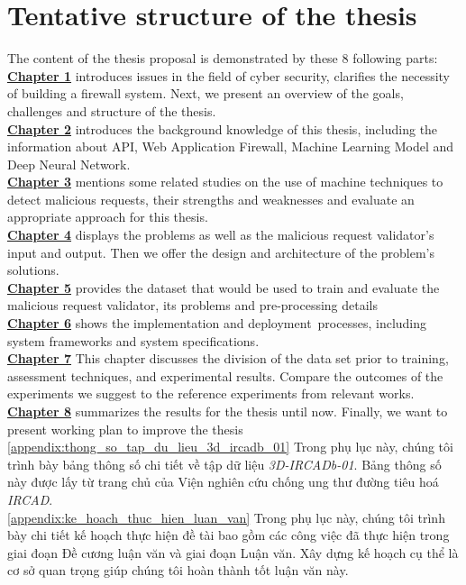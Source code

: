 \section{Tentative structure of the thesis}
\label{sec:structure}
	\newcommand\nextintro{\\[4mm]}
	The content of the thesis proposal is demonstrated by these 8 following parts: \nextintro
	\hyperref[chap:introduction]{\textbf{Chapter 1}} introduces issues in the field of cyber security, clarifies the necessity of building a firewall system. Next, we present an overview of the goals, challenges and structure of the thesis.\nextintro
	\hyperref[chap:backgrounds]{\textbf{Chapter 2}} introduces the background knowledge of this thesis, including the information about API, Web Application Firewall, Machine Learning Model and Deep Neural Network.\nextintro
	\hyperref[chap:literaturereview]{\textbf{Chapter 3}} mentions some related studies on the use of machine techniques to detect malicious requests, their strengths and weaknesses and evaluate an appropriate approach for this thesis.\nextintro
	\hyperref[chap:phuong_an_de_xuat]{\textbf{Chapter 4}} displays the problems as well as the malicious request validator's input and output. Then we offer the design and architecture of the problem's solutions.\nextintro
	\hyperref[chap:tap_du_lieu]{\textbf{Chapter 5}} provides the dataset that would be used to train and evaluate the malicious request validator, its problems and pre-processing details\nextintro
	\hyperref[chap:hien_thuc_he_thong]{\textbf{Chapter 6}} shows the implementation and deployment processes, including system frameworks and system specifications.\nextintro
	\hyperref[chap:thi_nghiem_va_danh_gia]{\textbf{Chapter 7}} This chapter discusses the division of the data set prior to training, assessment techniques, and experimental results. Compare the outcomes of the experiments we suggest to the reference experiments from relevant works.\nextintro
	\hyperref[chap:tong_ket]{\textbf{Chapter 8}} summarizes the results for the thesis until now. Finally, we want to present working plan to improve the thesis\nextintro
	\ref{appendix:thong_so_tap_du_lieu_3d_ircadb_01} Trong phụ lục này, chúng tôi trình bày bảng thông số chi tiết về tập dữ liệu \textit{3D-IRCADb-01}. Bảng thông số này được lấy từ trang chủ của Viện nghiên cứu chống ung thư đường tiêu hoá \textit{IRCAD}. \nextintro
	\ref{appendix:ke_hoach_thuc_hien_luan_van} Trong phụ lục này, chúng tôi trình bày chi tiết kế hoạch thực hiện đề tài bao gồm các công việc đã thực hiện trong giai đoạn Đề cương luận văn và giai đoạn Luận văn. Xây dựng kế hoạch cụ thể là cơ sở quan trọng giúp chúng tôi hoàn thành tốt luận văn này.